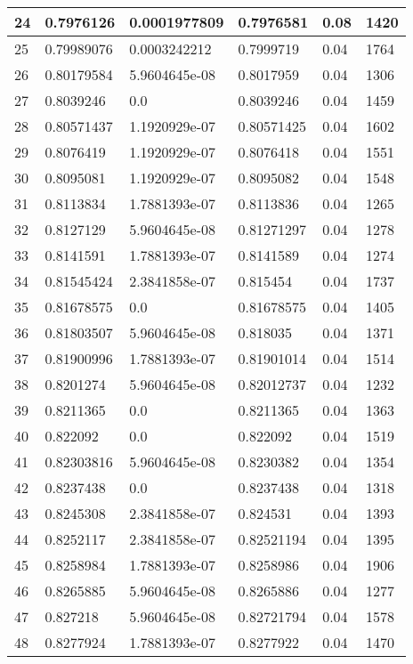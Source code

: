 \begin{longtable}{|l|l|l|l|l|l|}
24 & 0.7976126 & 0.0001977809 & 0.7976581 & 0.08 & 1420 \\ \hline 
25 & 0.79989076 & 0.0003242212 & 0.7999719 & 0.04 & 1764 \\ \hline 
26 & 0.80179584 & 5.9604645e-08 & 0.8017959 & 0.04 & 1306 \\ \hline 
27 & 0.8039246 & 0.0 & 0.8039246 & 0.04 & 1459 \\ \hline 
28 & 0.80571437 & 1.1920929e-07 & 0.80571425 & 0.04 & 1602 \\ \hline 
29 & 0.8076419 & 1.1920929e-07 & 0.8076418 & 0.04 & 1551 \\ \hline 
30 & 0.8095081 & 1.1920929e-07 & 0.8095082 & 0.04 & 1548 \\ \hline 
31 & 0.8113834 & 1.7881393e-07 & 0.8113836 & 0.04 & 1265 \\ \hline 
32 & 0.8127129 & 5.9604645e-08 & 0.81271297 & 0.04 & 1278 \\ \hline 
33 & 0.8141591 & 1.7881393e-07 & 0.8141589 & 0.04 & 1274 \\ \hline 
34 & 0.81545424 & 2.3841858e-07 & 0.815454 & 0.04 & 1737 \\ \hline 
35 & 0.81678575 & 0.0 & 0.81678575 & 0.04 & 1405 \\ \hline 
36 & 0.81803507 & 5.9604645e-08 & 0.818035 & 0.04 & 1371 \\ \hline 
37 & 0.81900996 & 1.7881393e-07 & 0.81901014 & 0.04 & 1514 \\ \hline 
38 & 0.8201274 & 5.9604645e-08 & 0.82012737 & 0.04 & 1232 \\ \hline 
39 & 0.8211365 & 0.0 & 0.8211365 & 0.04 & 1363 \\ \hline 
40 & 0.822092 & 0.0 & 0.822092 & 0.04 & 1519 \\ \hline 
41 & 0.82303816 & 5.9604645e-08 & 0.8230382 & 0.04 & 1354 \\ \hline 
42 & 0.8237438 & 0.0 & 0.8237438 & 0.04 & 1318 \\ \hline 
43 & 0.8245308 & 2.3841858e-07 & 0.824531 & 0.04 & 1393 \\ \hline 
44 & 0.8252117 & 2.3841858e-07 & 0.82521194 & 0.04 & 1395 \\ \hline 
45 & 0.8258984 & 1.7881393e-07 & 0.8258986 & 0.04 & 1906 \\ \hline 
46 & 0.8265885 & 5.9604645e-08 & 0.8265886 & 0.04 & 1277 \\ \hline 
47 & 0.827218 & 5.9604645e-08 & 0.82721794 & 0.04 & 1578 \\ \hline 
48 & 0.8277924 & 1.7881393e-07 & 0.8277922 & 0.04 & 1470 \\ \hline 

\end{longtable}
